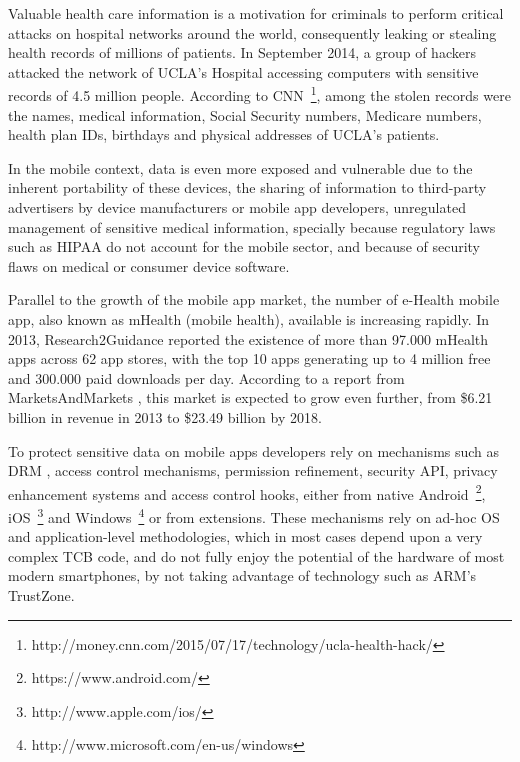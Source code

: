 Valuable health care information is a motivation for criminals to perform critical attacks on hospital networks around the world, consequently leaking or stealing health records of millions of patients. In September 2014, a group of hackers attacked the network of \ac{UCLA}'s Hospital accessing computers with sensitive records of 4.5 million people. According to \ac{CNN}~\footnote{http://money.cnn.com/2015/07/17/technology/ucla-health-hack/}, among the stolen records were the names, medical information, Social Security numbers, Medicare numbers, health plan IDs, birthdays and physical addresses of \ac{UCLA}'s patients.

In the mobile context, data is even more exposed and vulnerable due to the inherent portability of these devices, the sharing of information to third-party advertisers by device manufacturers or mobile app developers, unregulated management of sensitive medical information, specially because regulatory laws such as \ac{HIPAA} do not account for the mobile sector, and because of security flaws on medical or consumer device software.

Parallel to the growth of the mobile app market, the number of e-Health mobile app, also known as mHealth (mobile health), available is increasing rapidly. In 2013, Research2Guidance \cite{research2guidance} reported the existence of more than 97.000 mHealth apps across 62 app stores, with the top 10 apps generating up to 4 million free and 300.000 paid downloads per day. According to a report from MarketsAndMarkets \cite{marketsandmarkets}, this market is expected to grow even further, from \$6.21 billion in revenue in 2013 to \$23.49 billion by 2018.


To protect sensitive data on mobile apps developers rely on mechanisms such as \ac{DRM} \cite{drm}, access control mechanisms, permission refinement, security \ac{API}, privacy enhancement systems and access control hooks, either from native Android~\footnote{https://www.android.com/}, iOS~\footnote{http://www.apple.com/ios/} and Windows~\footnote{http://www.microsoft.com/en-us/windows} or from extensions. These mechanisms rely on ad-hoc \ac{OS} and application-level methodologies, which in most cases depend upon a very complex \ac{TCB} code, and do not fully enjoy the potential of the hardware of most modern smartphones, by not taking advantage of technology such as ARM's TrustZone.\\

